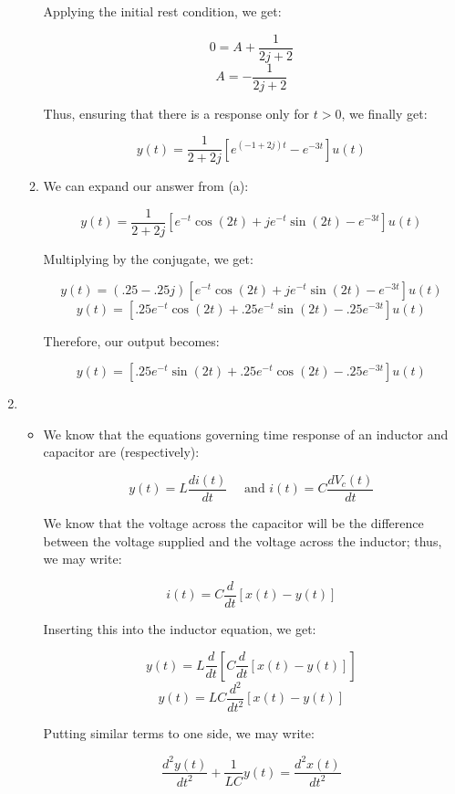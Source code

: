 \begin{enumerate}
\begin{enumerate}
        Applying the initial rest condition, we get:

        $$0=A+\frac{1}{2j+2}$$
        $$A=-\frac{1}{2j+2}$$

        Thus, ensuring that there is a response only for $t>0$, we finally get:

        $$\boxed{y(t)=\frac{1}{2+2j}\left[ e^{(-1+2j)t}-e^{-3t} \right]u(t)}$$

      \item 

        We can expand our answer from (a):

        $$y(t)=\frac{1}{2+2j}\left[ e^{-t}\cos(2t)+je^{-t}\sin(2t)-e^{-3t} \right]u(t)$$

        Multiplying by the conjugate, we get:

        $$y(t)=(.25-.25j)\left[ e^{-t}\cos(2t)+je^{-t}\sin(2t)-e^{-3t} \right]u(t)$$
        $$y(t)=\left[ .25e^{-t}\cos(2t)+.25e^{-t}\sin(2t)-.25e^{-3t} \right]u(t)$$

        Therefore, our output becomes:

        $$\boxed{y(t)=\left[ .25e^{-t}\sin(2t)+.25e^{-t}\cos(2t)-.25e^{-3t}\right]u(t)}$$

    \end{enumerate}

  \item

    \begin{itemize}

      \item We know that the equations governing time response of an inductor and capacitor are (respectively):

        $$y(t)=L\frac{di(t)}{dt}\quad\text{ and }i(t)=C\frac{dV_c(t)}{dt}$$

        We know that the voltage across the capacitor will be the difference between the voltage supplied and the voltage across the inductor; thus, we may write:

        $$i(t)=C\frac{d}{dt}\left[ x(t)-y(t) \right]$$

        Inserting this into the inductor equation, we get:

        $$y(t)=L\frac{d}{dt}\left[ C\frac{d}{dt}\left[ x(t)-y(t) \right] \right]$$
        $$y(t)=LC\frac{d^2}{dt^2}\left[x(t)-y(t) \right]$$

        Putting similar terms to one side, we may write:

        $$\frac{d^2y(t)}{dt^2}+\frac{1}{LC}y(t)=\frac{d^2x(t)}{dt^2}$$


\end{itemize}
\end{enumerate}
